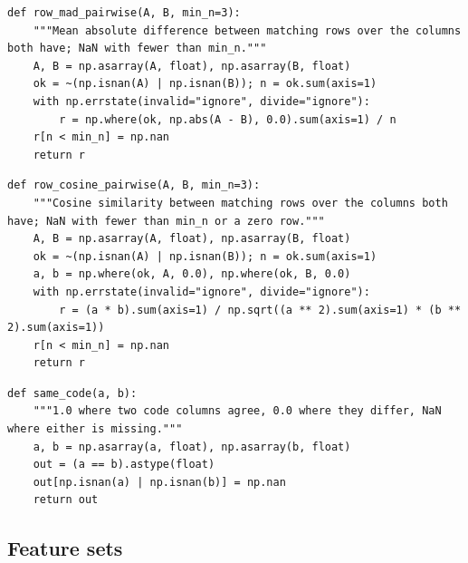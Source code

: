 \documentclass[11pt]{article}
\begin{document}
\begin{lstlisting}[caption={Mean absolute difference of interests (scripts/pairs.py)}]
def row_mad_pairwise(A, B, min_n=3):
    """Mean absolute difference between matching rows over the columns both have; NaN with fewer than min_n."""
    A, B = np.asarray(A, float), np.asarray(B, float)
    ok = ~(np.isnan(A) | np.isnan(B)); n = ok.sum(axis=1)
    with np.errstate(invalid="ignore", divide="ignore"):
        r = np.where(ok, np.abs(A - B), 0.0).sum(axis=1) / n
    r[n < min_n] = np.nan
    return r
\end{lstlisting}

\begin{lstlisting}[caption={Cosine similarity of interests (scripts/pairs.py)}]
def row_cosine_pairwise(A, B, min_n=3):
    """Cosine similarity between matching rows over the columns both have; NaN with fewer than min_n or a zero row."""
    A, B = np.asarray(A, float), np.asarray(B, float)
    ok = ~(np.isnan(A) | np.isnan(B)); n = ok.sum(axis=1)
    a, b = np.where(ok, A, 0.0), np.where(ok, B, 0.0)
    with np.errstate(invalid="ignore", divide="ignore"):
        r = (a * b).sum(axis=1) / np.sqrt((a ** 2).sum(axis=1) * (b ** 2).sum(axis=1))
    r[n < min_n] = np.nan
    return r
\end{lstlisting}

\begin{lstlisting}[caption={Same field, goal or career (scripts/pairs.py)}]
def same_code(a, b):
    """1.0 where two code columns agree, 0.0 where they differ, NaN where either is missing."""
    a, b = np.asarray(a, float), np.asarray(b, float)
    out = (a == b).astype(float)
    out[np.isnan(a) | np.isnan(b)] = np.nan
    return out
\end{lstlisting}

\subsection{Feature sets}
\end{document}
